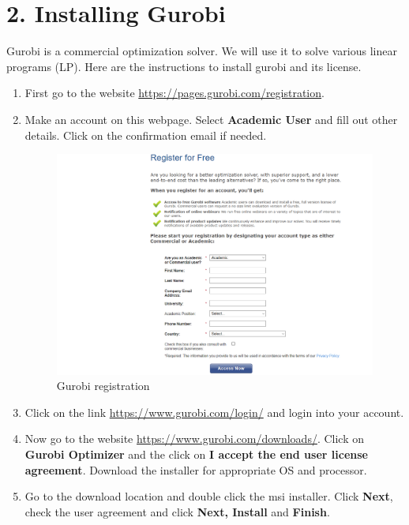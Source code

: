 \documentclass[11pt]{article}
\begin{document}
	\FloatBarrier

	\section*{2. Installing Gurobi}
	Gurobi is a commercial optimization solver. We will use it to solve various linear programs (LP). Here are the instructions to install gurobi and its license.
	
	\begin{enumerate}
		\item First go to the website \href{https://pages.gurobi.com/registration}{https://pages.gurobi.com/registration}.
		\item Make an account on this webpage. Select \textbf{Academic User} and fill out other details. Click on the confirmation email if needed.
		\begin{figure}[h!]
			\centering
			\includegraphics[width=\linewidth]{Fig/account.png}
			\caption{Gurobi registration}
			\label{fig:condap}
		\end{figure}
		\item Click on the link \href{https://www.gurobi.com/login/}{https://www.gurobi.com/login/} and login into your account.
		\item Now go to the website \href{https://www.gurobi.com/downloads/}{https://www.gurobi.com/downloads/}. Click on \textbf{Gurobi Optimizer} and the click on \textbf{I accept the end user license agreement}. Download the installer for appropriate OS and processor.
		\item Go to the download location and double click the msi installer. Click \textbf{Next}, check the user agreement and click \textbf{Next, Install} and \textbf{Finish}.
		

\end{enumerate}
\end{document}
